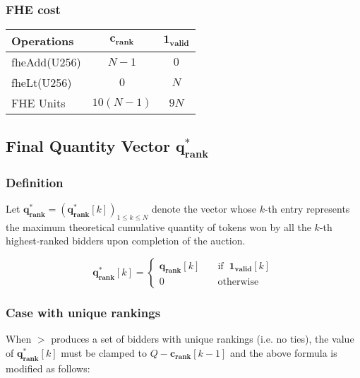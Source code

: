 \subsubsection{FHE cost}

\renewcommand{\arraystretch}{1.5}
\begin{tabular}{ |l|c|c| }
    \hline    
    Operations & $\mathbf{c_{rank}}$ & $\mathbf{1_{valid}}$ \\ 
    \hline
    fheAdd(U256) & $N-1$ & $0$  \\
    fheLt(U256)  & $0$ & $N$    \\
    \hline
    \hline
    FHE Units    & $10(N-1)$ & $9N$ \\
    \hline
\end{tabular}


\subsection{Final Quantity Vector $\mathbf{q_{rank}^{*}}$}

\subsubsection{Definition}
Let $\mathbf{q_{rank}^{*}} = (\mathbf{q_{rank}^{*}}[k])_{1 \le k \le N}$ denote the vector whose $k$-th entry represents the maximum theoretical cumulative quantity of tokens won by all the $k$-th highest-ranked bidders upon completion of the auction.

\begin{equation*}
    \mathbf{q_{rank}^{*}}[k] = 
    \begin{cases}
        \mathbf{q_{rank}}[k] \quad & \text{if } \ \mathbf{1_{valid}}[k] \\
        0 \quad & \text{otherwise }
    \end{cases}
\end{equation*}

\subsubsection{Case with unique rankings}
When $>$ produces a set of bidders with unique rankings (i.e. no ties), the value of $\mathbf{q_{rank}^{*}}[k]$ must be clamped to $Q - \mathbf{c_{rank}}[k-1]$ and the above formula is modified as follows:

